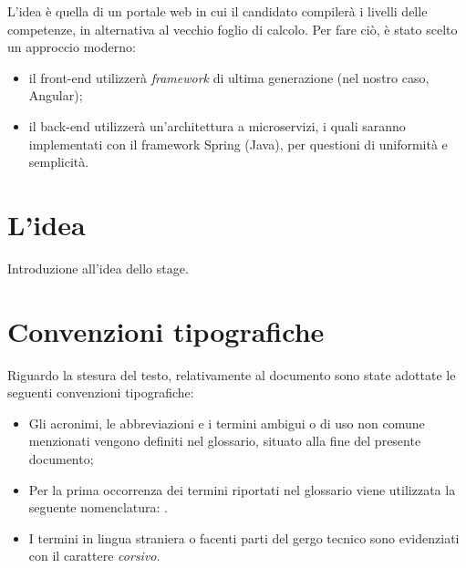L'idea è quella di un portale web in cui il candidato compilerà i livelli delle competenze, in alternativa al vecchio foglio di calcolo.
Per fare ciò, è stato scelto un approccio moderno: 
\begin{itemize}
	\item il front-end utilizzerà \textit{framework} di ultima generazione (nel nostro caso, Angular);
	\item il back-end utilizzerà un'architettura a microservizi, i quali saranno implementati con il framework Spring (Java), per questioni di uniformità e semplicità.
\end{itemize}


\section{L'idea}

Introduzione all'idea dello stage.

\section{Convenzioni tipografiche}







Riguardo la stesura del testo, relativamente al documento sono state adottate le seguenti convenzioni tipografiche:
\begin{itemize}
	\item Gli acronimi, le abbreviazioni e i termini ambigui o di uso non comune menzionati vengono definiti nel glossario, situato alla fine del presente documento;
	\item Per la prima occorrenza dei termini riportati nel glossario viene utilizzata la seguente nomenclatura: .
	\item I termini in lingua straniera o facenti parti del gergo tecnico sono evidenziati con il carattere \emph{corsivo}.
\end{itemize}

